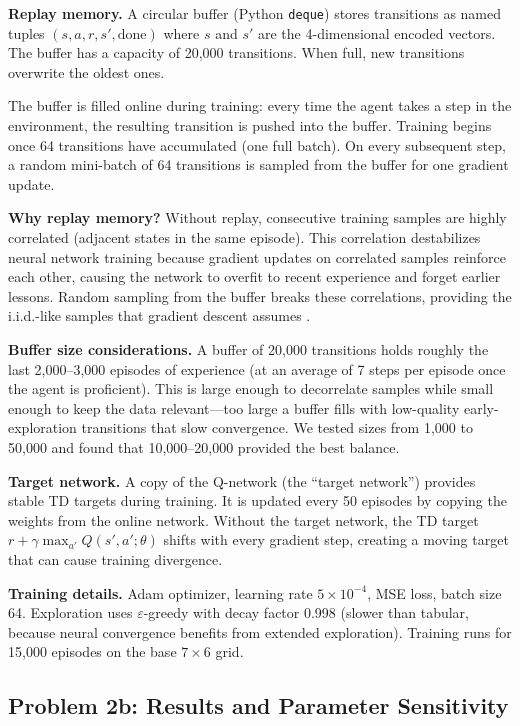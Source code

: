 \documentclass[letterpaper]{article}
\begin{document}
\textbf{Replay memory.} A circular buffer (Python \texttt{deque}) stores transitions as named tuples $(s, a, r, s', \text{done})$ where $s$ and $s'$ are the 4-dimensional encoded vectors. The buffer has a capacity of 20,000 transitions. When full, new transitions overwrite the oldest ones.

The buffer is filled online during training: every time the agent takes a step in the environment, the resulting transition is pushed into the buffer. Training begins once 64 transitions have accumulated (one full batch). On every subsequent step, a random mini-batch of 64 transitions is sampled from the buffer for one gradient update.

\textbf{Why replay memory?} Without replay, consecutive training samples are highly correlated (adjacent states in the same episode). This correlation destabilizes neural network training because gradient updates on correlated samples reinforce each other, causing the network to overfit to recent experience and forget earlier lessons. Random sampling from the buffer breaks these correlations, providing the i.i.d.-like samples that gradient descent assumes \citep{mnih2015human}.

\textbf{Buffer size considerations.} A buffer of 20,000 transitions holds roughly the last 2,000--3,000 episodes of experience (at an average of 7 steps per episode once the agent is proficient). This is large enough to decorrelate samples while small enough to keep the data relevant---too large a buffer fills with low-quality early-exploration transitions that slow convergence. We tested sizes from 1,000 to 50,000 and found that 10,000--20,000 provided the best balance.

\textbf{Target network.} A copy of the Q-network (the ``target network'') provides stable TD targets during training. It is updated every 50 episodes by copying the weights from the online network. Without the target network, the TD target $r + \gamma \max_{a'} Q(s', a'; \theta)$ shifts with every gradient step, creating a moving target that can cause training divergence.

\textbf{Training details.} Adam optimizer, learning rate $5 \times 10^{-4}$, MSE loss, batch size 64. Exploration uses $\varepsilon$-greedy with decay factor 0.998 (slower than tabular, because neural convergence benefits from extended exploration). Training runs for 15,000 episodes on the base $7 \times 6$ grid.


\subsection{Problem 2b: Results and Parameter Sensitivity}
\end{document}
